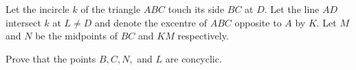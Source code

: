 Let the incircle $k$ of the triangle $ABC$ touch its side $BC$ at $D$. Let the line $AD$ intersect $k$ at $L \neq D$ and denote the excentre of $ABC$ opposite to $A$ by $K$. Let $M$ and $N$ be the midpoints of $BC$ and $KM$ respectively.

Prove that the points $B, C, N,$ and $L$ are concyclic.